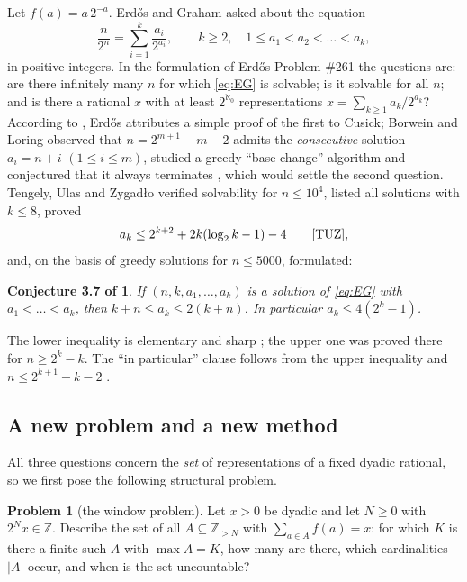 \documentclass[11pt]{amsart}
\newtheorem*{tuzconj}{Conjecture 3.7 of \cite{TUZ}}
\theoremstyle{definition}
\newtheorem{problem}{Problem}
\theoremstyle{remark}
\newcommand{\Z}{\mathbb{Z}}
\begin{document}
Let $f(a)=a\,2^{-a}$. Erd\H{o}s and Graham \cite{EG80} asked about the equation
\begin{equation}\label{eq:EG}
\frac{n}{2^n}=\sum_{i=1}^{k}\frac{a_i}{2^{a_i}},\qquad k\ge 2,\quad 1\le a_1<a_2<\dots<a_k ,
\end{equation}
in positive integers. In the formulation of Erd\H{o}s Problem \#261 \cite{EP261} the questions are: are there infinitely many $n$ for which \eqref{eq:EG} is solvable; is it solvable for all $n$; and is there a rational $x$ with at least $2^{\aleph_0}$ representations $x=\sum_{k\ge1}a_k/2^{a_k}$? According to \cite{EP261}, Erd\H{o}s \cite{Er88} attributes a simple proof of the first to Cusick; Borwein and Loring \cite{BL90} observed that $n=2^{m+1}-m-2$ admits the \emph{consecutive} solution $a_i=n+i$ $(1\le i\le m)$, studied a greedy ``base change'' algorithm and conjectured that it always terminates \cite[Conj.~1]{BL90}, which would settle the second question. Tengely, Ulas and Zygad\l{}o \cite{TUZ} verified solvability for $n\le 10^4$, listed all solutions with $k\le 8$, proved
\begin{equation}\label{eq:TUZbound}
a_k\le 2^{k+2}+2k(\log_2k-1)-4\qquad\text{\cite[Cor.~2.9]{TUZ}},
\end{equation}
and, on the basis of greedy solutions for $n\le 5000$, formulated:

\begin{tuzconj}
If $(n,k,a_1,\dots,a_k)$ is a solution of \eqref{eq:EG} with $a_1<\dots<a_k$, then $k+n\le a_k\le 2(k+n)$. In particular $a_k\le 4(2^k-1)$.
\end{tuzconj}

The lower inequality is elementary and sharp \cite[Rem.~3.8]{TUZ}; the upper one was proved there for $n\ge 2^k-k$. The ``in particular'' clause follows from the upper inequality and $n\le 2^{k+1}-k-2$ \cite[Thm.~2.1]{TUZ}.

\subsection*{A new problem and a new method}
All three questions concern the \emph{set} of representations of a fixed dyadic rational, so we first pose the following structural problem.

\begin{problem}[the window problem]\label{prob:A}
Let $x>0$ be dyadic and let $N\ge0$ with $2^Nx\in\Z$. Describe the set of all $A\subseteq\Z_{>N}$ with $\sum_{a\in A}f(a)=x$: for which $K$ is there a finite such $A$ with $\max A=K$, how many are there, which cardinalities $|A|$ occur, and when is the set uncountable?
\end{problem}
\end{document}

